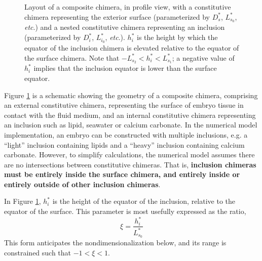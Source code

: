 \documentclass[10pt,a4paper]{article}
\def\etc{\emph{etc}.\xspace}
\begin{document}
\begin{figure}[t]
\begin{center}
{\begin{tikzpicture}
			\end{tikzpicture}
		}
	\end{center}
	\caption{Layout of a composite chimera, in profile view, with a constitutive chimera representing the exterior surface (parameterized by $D_s^*$, $L^*_{s_0}$, \etc) and a nested constitutive chimera representing an inclusion (parameterized by $D_i^*$, $L^*_{i_0}$, \etc). 
	$h_i^*$ is the height by which the equator of the inclusion chimera is elevated relative to the equator of the surface chimera. Note that $-L^*_{s_2} < h^*_i < L^*_{s_1}$; a negative value of $h^*_i$ implies that the inclusion equator is lower than the surface equator. 
	} \label{fig:chimera2}
\end{figure}
\noindent
Figure \ref{fig:chimera2} is a schematic showing the geometry of a composite chimera, comprising an external constitutive chimera, representing the surface of embryo tissue in contact with the fluid medium, and an internal constitutive chimera representing an inclusion such as lipid, seawater or calcium carbonate.
In the numerical model implementation, an embryo can be constructed with multiple inclusions, e.g. a ``light'' inclusion containing lipids and a ``heavy'' inclusion containing calcium carbonate.
However, to simplify calculations, the numerical model assumes there are no intersections between constitutive chimeras.
That is, \textbf{inclusion chimeras must be entirely inside the surface chimera, and entirely inside or entirely outside of other inclusion chimeras}.

In Figure \ref{fig:chimera2}, $h_i^*$ is the height of the equator of the inclusion, relative to the equator of the surface. 
This parameter is most usefully expressed as the ratio, 
\begin{equation}\label{phi_eq}
	\xi = \frac{h_i^*}{L_{s_0}^*}
\end{equation}
This form anticipates the nondimensionalization below, and its range is constrained such that $-1 < \xi < 1$.
\end{document}
